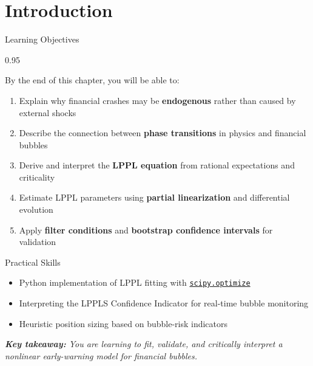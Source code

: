 \documentclass[9pt, aspectratio=169, t]{beamer}
\subtitle{Chapter 13: Log-Periodic Power Law (LPPL) Models}
\begin{document}
{
\begin{frame}
    \titlepage
\end{frame}
}

\section{Introduction}

\begin{frame}{Learning Objectives}
    \begin{cminipage}{0.95\textwidth}
    {\footnotesize
    \begin{block}{By the end of this chapter, you will be able to:}
        \begin{enumerate}\setlength{\itemsep}{2pt}
            \item Explain why financial crashes may be \textbf{endogenous} rather than caused by external shocks
            \item Describe the connection between \textbf{phase transitions} in physics and financial bubbles
            \item Derive and interpret the \textbf{LPPL equation} from rational expectations and criticality
            \item Estimate LPPL parameters using \textbf{partial linearization} and differential evolution
            \item Apply \textbf{filter conditions} and \textbf{bootstrap confidence intervals} for validation
        \end{enumerate}
    \end{block}
    \vspace{0.1cm}
    \begin{alertblock}{Practical Skills}
        \begin{itemize}\setlength{\itemsep}{0pt}
            \item Python implementation of LPPL fitting with \href{https://docs.scipy.org/doc/scipy/reference/optimize.html}{\texttt{scipy.optimize}}
            \item Interpreting the LPPLS Confidence Indicator for real-time bubble monitoring
            \item Heuristic position sizing based on bubble-risk indicators
        \end{itemize}
    \end{alertblock}
    \vspace{0.2cm}
    \textit{\textbf{Key takeaway:} You are learning to fit, validate, and critically interpret a nonlinear early-warning model for financial bubbles.}
    }
    \end{cminipage}
\end{frame}
\end{document}
